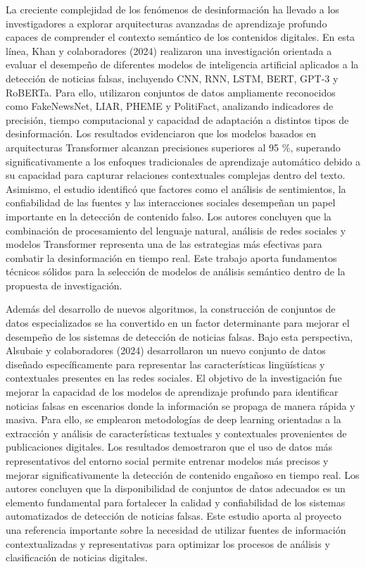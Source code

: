 \documentclass[12pt]{article}
\begin{document}
La creciente complejidad de los fenómenos de desinformación ha llevado a los investigadores a explorar arquitecturas avanzadas de aprendizaje profundo capaces de comprender el contexto semántico de los contenidos digitales. En esta línea, Khan y colaboradores (2024) realizaron una investigación orientada a evaluar el desempeño de diferentes modelos de inteligencia artificial aplicados a la detección de noticias falsas, incluyendo CNN, RNN, LSTM, BERT, GPT-3 y RoBERTa. Para ello, utilizaron conjuntos de datos ampliamente reconocidos como FakeNewsNet, LIAR, PHEME y PolitiFact, analizando indicadores de precisión, tiempo computacional y capacidad de adaptación a distintos tipos de desinformación. Los resultados evidenciaron que los modelos basados en arquitecturas Transformer alcanzan precisiones superiores al 95 \%, superando significativamente a los enfoques tradicionales de aprendizaje automático debido a su capacidad para capturar relaciones contextuales complejas dentro del texto. Asimismo, el estudio identificó que factores como el análisis de sentimientos, la confiabilidad de las fuentes y las interacciones sociales desempeñan un papel importante en la detección de contenido falso. Los autores concluyen que la combinación de procesamiento del lenguaje natural, análisis de redes sociales y modelos Transformer representa una de las estrategias más efectivas para combatir la desinformación en tiempo real. Este trabajo aporta fundamentos técnicos sólidos para la selección de modelos de análisis semántico dentro de la propuesta de investigación. 

Además del desarrollo de nuevos algoritmos, la construcción de conjuntos de datos especializados se ha convertido en un factor determinante para mejorar el desempeño de los sistemas de detección de noticias falsas. Bajo esta perspectiva, Alsubaie y colaboradores (2024) desarrollaron un nuevo conjunto de datos diseñado específicamente para representar las características lingüísticas y contextuales presentes en las redes sociales. El objetivo de la investigación fue mejorar la capacidad de los modelos de aprendizaje profundo para identificar noticias falsas en escenarios donde la información se propaga de manera rápida y masiva. Para ello, se emplearon metodologías de deep learning orientadas a la extracción y análisis de características textuales y contextuales provenientes de publicaciones digitales. Los resultados demostraron que el uso de datos más representativos del entorno social permite entrenar modelos más precisos y mejorar significativamente la detección de contenido engañoso en tiempo real. Los autores concluyen que la disponibilidad de conjuntos de datos adecuados es un elemento fundamental para fortalecer la calidad y confiabilidad de los sistemas automatizados de detección de noticias falsas. Este estudio aporta al proyecto una referencia importante sobre la necesidad de utilizar fuentes de información contextualizadas y representativas para optimizar los procesos de análisis y clasificación de noticias digitales.
\end{document}

